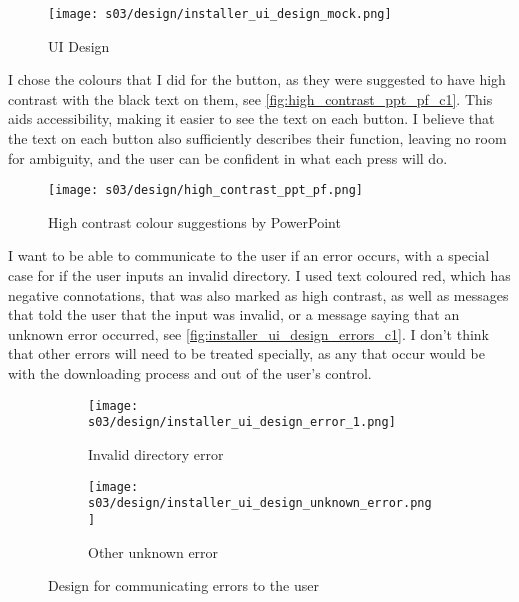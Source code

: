         \begin{figure}[!ht]
            \centering
            \texttt{[image: s03/design/installer\_ui\_design\_mock.png]}
            \caption{UI Design}
            \label{fig:installer_gui_design_c1}
        \end{figure}

        I chose the colours that I did for the button, as they were suggested to have high contrast with the black text on them, see \autoref{fig:high_contrast_ppt_pf_c1}. This aids accessibility, making it easier to see the text on each button. I believe that the text on each button also sufficiently describes their function, leaving no room for ambiguity, and the user can be confident in what each press will do. 

        \begin{figure}[!ht]
            \centering
            \texttt{[image: s03/design/high\_contrast\_ppt\_pf.png]}
            \caption{High contrast colour suggestions by PowerPoint}
            \label{fig:high_contrast_ppt_pf_c1}
        \end{figure}

        I want to be able to communicate to the user if an error occurs, with a special case for if the user inputs an invalid directory. I used text coloured red, which has negative connotations, that was also marked as high contrast, as well as messages that told the user that the input was invalid, or a message saying that an unknown error occurred, see \autoref{fig:installer_ui_design_errors_c1}. I don't think that other errors will need to be treated specially, as any that occur would be with the downloading process and out of the user's control.

        \begin{figure}[!ht]
            \begin{subfigure}{.5\textwidth}
                \centering
                \texttt{[image: s03/design/installer\_ui\_design\_error\_1.png]}
                \caption{Invalid directory error}
                \label{fig:installer_ui_design_directory_error}
            \end{subfigure}%
            \begin{subfigure}{.5\textwidth}
                \centering
                \texttt{[image: s03/design/installer\_ui\_design\_unknown\_error.png]}
                \caption{Other unknown error}
                \label{fig:installer_ui_design_other_error}
            \end{subfigure}%
            \caption{Design for communicating errors to the user}
            \label{fig:installer_ui_design_errors_c1}
        \end{figure}

